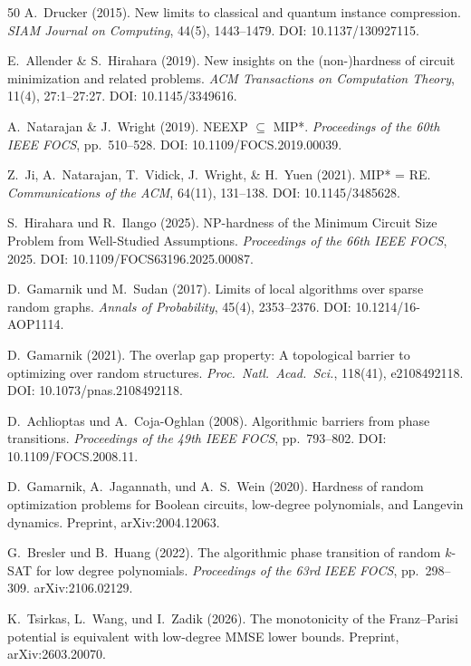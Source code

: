 \documentclass[aps,prd,twocolumn,superscriptaddress,nofootinbib]{revtex4-2}
\theoremstyle{definition}
\theoremstyle{remark}
\begin{document}
\begin{thebibliography}{50}
A.~Drucker (2015).
New limits to classical and quantum instance compression.
\textit{SIAM Journal on Computing}, 44(5), 1443--1479.
DOI: 10.1137/130927115.

E.~Allender \& S.~Hirahara (2019).
New insights on the (non-)hardness of circuit minimization and related problems.
\textit{ACM Transactions on Computation Theory}, 11(4), 27:1--27:27.
DOI: 10.1145/3349616.

A.~Natarajan \& J.~Wright (2019).
NEEXP $\subseteq$ MIP*.
\textit{Proceedings of the 60th IEEE FOCS}, pp.\ 510--528.
DOI: 10.1109/FOCS.2019.00039.

Z.~Ji, A.~Natarajan, T.~Vidick, J.~Wright, \& H.~Yuen (2021).
MIP* = RE.
\textit{Communications of the ACM}, 64(11), 131--138.
DOI: 10.1145/3485628.

S.~Hirahara und R.~Ilango (2025).
NP-hardness of the Minimum Circuit Size Problem from Well-Studied Assumptions.
\textit{Proceedings of the 66th IEEE FOCS}, 2025.
DOI: 10.1109/FOCS63196.2025.00087.

D.~Gamarnik und M.~Sudan (2017).
Limits of local algorithms over sparse random graphs.
\textit{Annals of Probability}, 45(4), 2353--2376.
DOI: 10.1214/16-AOP1114.

D.~Gamarnik (2021).
The overlap gap property: A topological barrier to optimizing over random structures.
\textit{Proc.\ Natl.\ Acad.\ Sci.}, 118(41), e2108492118.
DOI: 10.1073/pnas.2108492118.

D.~Achlioptas und A.~Coja-Oghlan (2008).
Algorithmic barriers from phase transitions.
\textit{Proceedings of the 49th IEEE FOCS}, pp.\ 793--802.
DOI: 10.1109/FOCS.2008.11.

D.~Gamarnik, A.~Jagannath, und A.~S.~Wein (2020).
Hardness of random optimization problems for Boolean circuits, low-degree polynomials, and Langevin dynamics.
Preprint, arXiv:2004.12063.

G.~Bresler und B.~Huang (2022).
The algorithmic phase transition of random $k$-SAT for low degree polynomials.
\textit{Proceedings of the 63rd IEEE FOCS}, pp.\ 298--309.
arXiv:2106.02129.

K.~Tsirkas, L.~Wang, und I.~Zadik (2026).
The monotonicity of the Franz--Parisi potential is equivalent with low-degree MMSE lower bounds.
Preprint, arXiv:2603.20070.


\end{thebibliography}
\end{document}
